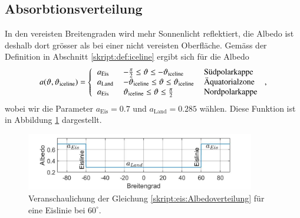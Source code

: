 \begin{refsection}
\subsection{Absorbtionsverteilung}
In den vereisten Breitengraden wird mehr Sonnenlicht reflektiert, die Albedo ist deshalb dort grösser als bei einer nicht vereisten Oberfläche. Gemäss der Definition in Abschnitt \ref{skript:def:iceline} ergibt sich für die Albedo
\begin{equation}\label{skript:eis:Albedoverteilung}
a(\vartheta,\vartheta_\text{iceline})
=
\left\{
\begin{tabular}{lll}
	$a_\text{Eis}$&$-\tfrac{\pi}{2}\leq\vartheta\leq-\vartheta_\text{iceline}$&$\text{Südpolarkappe}$\\
	$a_\text{Land}$&$-\vartheta_\text{iceline}\leq\vartheta\leq\vartheta_\text{iceline}$&$\text{Äquatorialzone}$\\
	$a_\text{Eis}$&$\vartheta_\text{iceline}\leq\vartheta\leq\tfrac{\pi}{2}$&$\text{Nordpolarkappe}$
\end{tabular}
\right.,
\end{equation}
wobei wir die Parameter $a_\text{Eis}=0.7$ und $a_\text{Land}=0.285$ wählen. Diese Funktion ist in Abbildung \ref{skript:eis:fig:Albedoverteilung} dargestellt.
\begin{figure}
	\centering
	\includegraphics[width=10cm]{eis/Albedo_abh_Breitengrad.jpg}
	\caption{Veranschaulichung der Gleichung \eqref{skript:eis:Albedoverteilung} für eine Eislinie bei $60^\circ$.}
	\label{skript:eis:fig:Albedoverteilung}
\end{figure}

\end{refsection}
